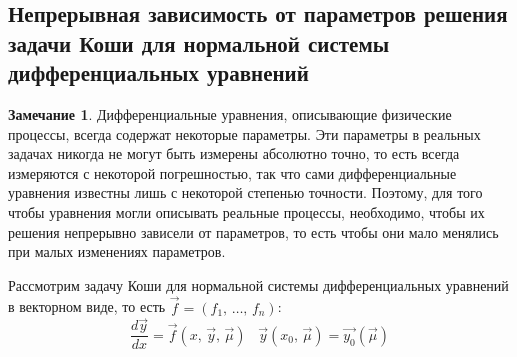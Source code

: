 \documentclass[a4paper,12pt]{article}
\theoremstyle{plain}
\theoremstyle{definition}
\newtheorem*{note}{Замечание}
\theoremstyle{remark}
\begin{document}
\subsection{Непрерывная зависимость от параметров решения задачи Коши для нормальной системы дифференциальных уравнений}
\begin{note}
	Дифференциальные уравнения, описывающие физические процессы, всегда содержат некоторые параметры. Эти параметры в реальных задачах никогда не могут быть измерены абсолютно точно, то есть всегда измеряются с некоторой погрешностью, так что сами дифференциальные уравнения известны лишь с некоторой степенью точности. Поэтому, для того чтобы уравнения могли описывать реальные процессы, необходимо, чтобы их решения непрерывно зависели от параметров, то есть чтобы они мало менялись при малых изменениях параметров.
\end{note}

Рассмотрим задачу Коши для нормальной системы дифференциальных уравнений в векторном виде, то есть $\vec{f} = (f_1,\,\ldots,\,f_n)$:
\begin{equation}\label{PARAM_CAUCHY}
	\frac{d\vec{y}}{dx} = \vec{f}(x,\,\vec{y},\,\vec{\mu})\;\;\; \vec{y}(x_0,\, \vec{\mu}) = \vec{y_0}(\vec{\mu})
\end{equation}
\end{document}
